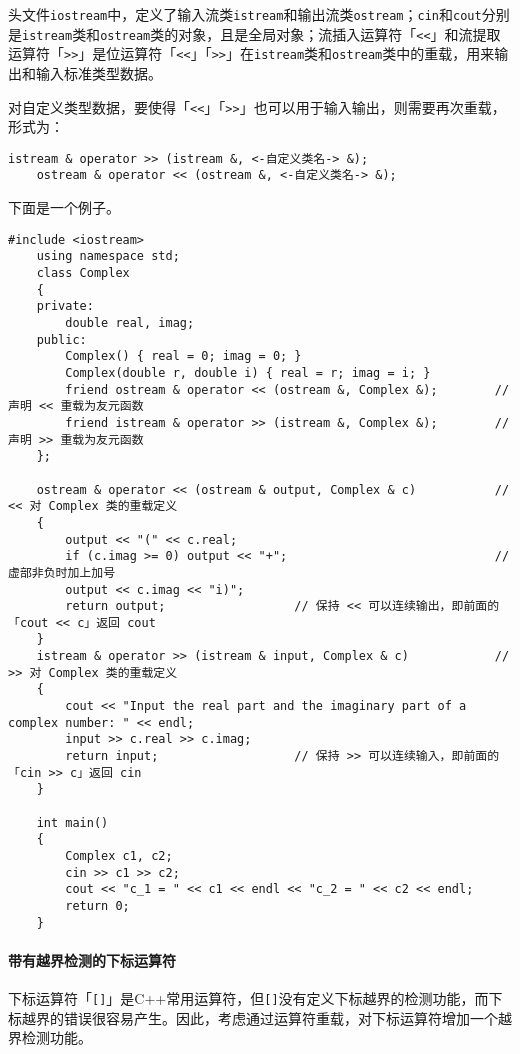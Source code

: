 \documentclass[10pt, a4paper, oneside, fontset=none]{ctexart}
\theoremstyle{plain}
\theoremstyle{definition}
\newcommand{\colors}[1]{\color{#1!75!black}}
\begin{document}
头文件\texttt{iostream}中，定义了输入流类\texttt{istream}和输出流类\texttt{ostream}；\texttt{cin}和\texttt{cout}分别是\texttt{istream}类和\texttt{ostream}类的对象，且是全局对象；流插入运算符「\texttt{<<}」和流提取运算符「\texttt{>>}」是位运算符「\texttt{<<}」「\texttt{>>}」在\texttt{istream}类和\texttt{ostream}类中的重载，用来输出和输入标准类型数据。

对自定义类型数据，要使得「\texttt{<<}」「\texttt{>>}」也可以用于输入输出，则需要再次重载，形式为：
\begin{lstlisting}[style=intro]
	istream & operator >> (istream &, <-自定义类名-> &);
	ostream & operator << (ostream &, <-自定义类名-> &);
\end{lstlisting}
下面是一个例子。
\begin{lstlisting}[moreemph={Complex, istream, ostream}, emphstyle=\colors{qinglv}, moreemph={[2]{real, imag, i, r, c, output, input, c1, c2}}, emphstyle={[2]\it\ttfamily},]
	#include <iostream>
	using namespace std;
	class Complex
	{
	private:
		double real, imag;
	public:
		Complex() { real = 0; imag = 0; }
		Complex(double r, double i) { real = r; imag = i; }
		friend ostream & operator << (ostream &, Complex &);		// 声明 << 重载为友元函数
		friend istream & operator >> (istream &, Complex &);		// 声明 >> 重载为友元函数
	};

	ostream & operator << (ostream & output, Complex & c)			// << 对 Complex 类的重载定义
	{
		output << "(" << c.real;
		if (c.imag >= 0) output << "+";								// 虚部非负时加上加号
		output << c.imag << "i)";
		return output;					// 保持 << 可以连续输出，即前面的「cout << c」返回 cout
	}
	istream & operator >> (istream & input, Complex & c)			// >> 对 Complex 类的重载定义
	{
		cout << "Input the real part and the imaginary part of a complex number: " << endl;
		input >> c.real >> c.imag;
		return input;					// 保持 >> 可以连续输入，即前面的「cin >> c」返回 cin
	}

	int main()
	{
		Complex c1, c2;
		cin >> c1 >> c2;
		cout << "c_1 = " << c1 << endl << "c_2 = " << c2 << endl;
		return 0;
	}
\end{lstlisting}

\paragraph{带有越界检测的下标运算符}

下标运算符「\texttt{[]}」是C++常用运算符，但\texttt{[]}没有定义下标越界的检测功能，而下标越界的错误很容易产生。因此，考虑通过运算符重载，对下标运算符增加一个越界检测功能。
\end{document}
